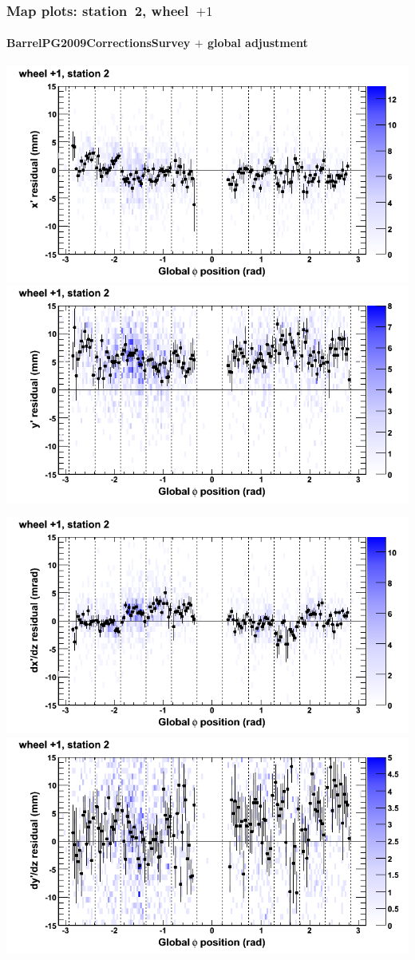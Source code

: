 \documentclass[compress]{beamer}
\begin{document}
\begin{frame}
\frametitle{Map plots: station~2, wheel~$+1$}
\framesubtitle{BarrelPG2009CorrectionsSurvey $+$ global adjustment}
\includegraphics[width=0.5\linewidth]{mapplots_re01/DTvsphi_st2whD_x.png}
\includegraphics[width=0.5\linewidth]{mapplots_re01/DTvsphi_st2whD_y.png}

\includegraphics[width=0.5\linewidth]{mapplots_re01/DTvsphi_st2whD_dxdz.png}
\includegraphics[width=0.5\linewidth]{mapplots_re01/DTvsphi_st2whD_dydz.png}
\end{frame}
\end{document}
